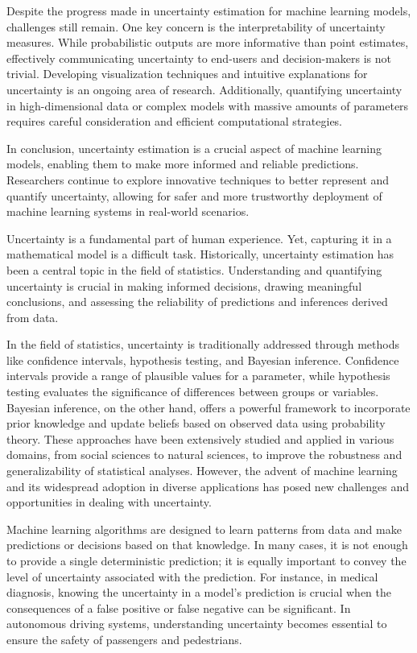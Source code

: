 Despite the progress made in uncertainty estimation for machine learning models, challenges still remain. One key concern is the interpretability of uncertainty measures. While probabilistic outputs are more informative than point estimates, effectively communicating uncertainty to end-users and decision-makers is not trivial. Developing visualization techniques and intuitive explanations for uncertainty is an ongoing area of research. Additionally, quantifying uncertainty in high-dimensional data or complex models with massive amounts of parameters requires careful consideration and efficient computational strategies.

In conclusion, uncertainty estimation is a crucial aspect of machine learning models, enabling them to make more informed and reliable predictions. Researchers continue to explore innovative techniques to better represent and quantify uncertainty, allowing for safer and more trustworthy deployment of machine learning systems in real-world scenarios.





Uncertainty is a fundamental part of human experience. Yet, capturing it in a mathematical model is a difficult task. Historically, uncertainty estimation has been a central topic in the field of statistics. Understanding and quantifying uncertainty is crucial in making informed decisions, drawing meaningful conclusions, and assessing the reliability of predictions and inferences derived from data.


In the field of statistics, uncertainty is traditionally addressed through methods like confidence intervals, hypothesis testing, and Bayesian inference. Confidence intervals provide a range of plausible values for a parameter, while hypothesis testing evaluates the significance of differences between groups or variables. Bayesian inference, on the other hand, offers a powerful framework to incorporate prior knowledge and update beliefs based on observed data using probability theory. These approaches have been extensively studied and applied in various domains, from social sciences to natural sciences, to improve the robustness and generalizability of statistical analyses.
However, the advent of machine learning and its widespread adoption in diverse applications has posed new challenges and opportunities in dealing with uncertainty. 

Machine learning algorithms are designed to learn patterns from data and make predictions or decisions based on that knowledge. In many cases, it is not enough to provide a single deterministic prediction; it is equally important to convey the level of uncertainty associated with the prediction. For instance, in medical diagnosis, knowing the uncertainty in a model's prediction is crucial when the consequences of a false positive or false negative can be significant. In autonomous driving systems, understanding uncertainty becomes essential to ensure the safety of passengers and pedestrians.

